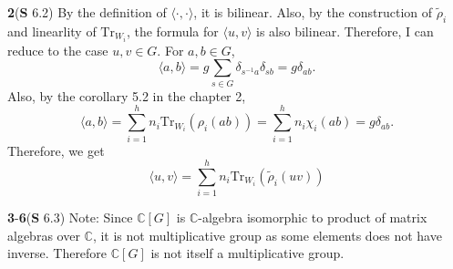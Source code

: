 \documentclass[a4paper, 12pt]{article}
\theoremstyle{Mydefinition}
\theoremstyle{Mytheorem}
\begin{document}
\noindent \textbf{2}(\textbf{S} 6.2)
By the definition of $\langle \cdot,\cdot\rangle$, it is bilinear. Also, by the construction of $\tilde{\rho}_i$ and linearlity of $\mathrm{Tr}_{W_i}$, the formula for $\langle u,v\rangle$ is also bilinear. Therefore, I can reduce to the case $u,v\in G$. For $a,b\in G$,
\begin{equation}
    \langle a, b\rangle = g\sum_{s\in G}\delta_{s^{-1}a}\delta_{sb} = g\delta_{ab}.
\end{equation}
Also, by the corollary 5.2 in the chapter 2, 
\begin{equation}
    \langle a, b\rangle = \sum_{i=1}^h n_i\mathrm{Tr}_{W_i}(\rho_i(ab)) = \sum_{i=1}^h n_i\chi_i(ab) = g\delta_{ab}.
\end{equation}
Therefore, we get
\begin{equation}
    \langle u,v\rangle = \sum_{i=1}^h n_i\mathrm{Tr}_{W_i}(\tilde{\rho}_i(uv))
\end{equation}

\noindent \textbf{3}-\textbf{6}(\textbf{S} 6.3)
Note: Since $\mathbb{C}[G]$ is $\mathbb{C}$-algebra isomorphic to product of matrix algebras over $\mathbb{C}$, it is not multiplicative group as some elements does not have inverse. Therefore $\mathbb{C}[G]$ is not itself a multiplicative group.
\end{document}
